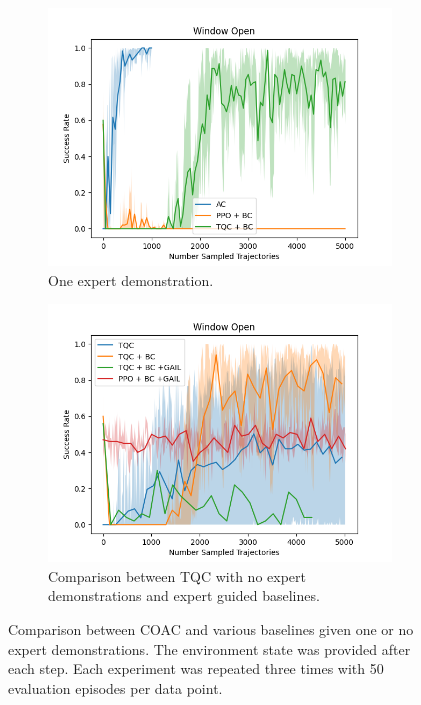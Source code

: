 \begin{figure}[htbp]
\begin{subfigure}[t]{0.45\textwidth}
    \includegraphics[width=\textwidth]{images/dense_1/Window Open.png}
    \caption{One expert demonstration.}
  \end{subfigure}
  \hfill
  \begin{subfigure}[t]{0.45\textwidth}
    \includegraphics[width=\textwidth]{images/TQC_bc_GAIL_vs_ref/Window Open.png}
    \caption{Comparison between TQC with no expert demonstrations and expert guided baselines.}
    \label{fig:TQC_0_vs_exp}
  \end{subfigure}
  \caption{Comparison between COAC and various baselines given one or no expert demonstrations. The environment state was provided after each step.
  Each experiment was repeated three times with 50 evaluation episodes per data point.}
  \label{fig:dense_ref}
\end{figure}


